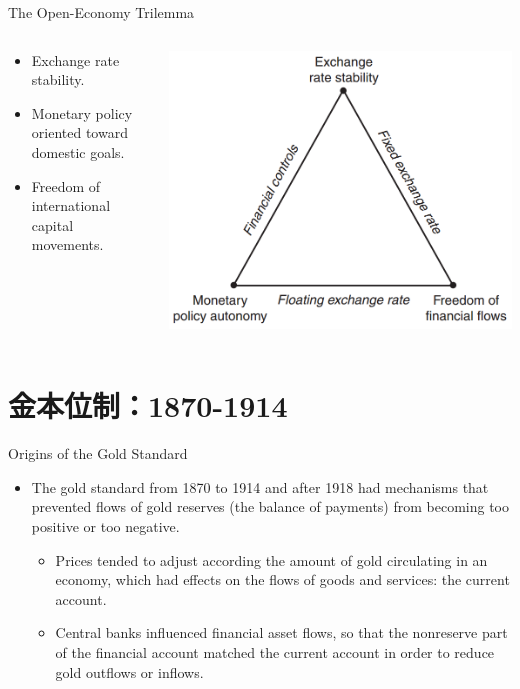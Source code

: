 \documentclass[10pt,hyperref={CJKbookmarks=true},xcolor=dvipsnames,aspectratio=169]{beamer}
\begin{document}
\begin{frame}{The Open-Economy Trilemma}
\begin{columns}[onlytextwidth]
	\begin{column}{0.6\textwidth}
		\begin{itemize}
			\item Exchange rate stability.
			\item Monetary policy oriented toward domestic goals.
			\item Freedom of international capital movements.
		\end{itemize}
	\end{column}
	\begin{column}{0.4\textwidth}
		\centering
		\includegraphics[scale=0.3]{fig/systems/trilemma}
	\end{column}
\end{columns}
\end{frame}


\section{金本位制：1870-1914}
\begin{frame}{Origins of the Gold Standard}
	\begin{itemize}
		\item The gold standard from 1870 to 1914 and after
		1918 had mechanisms that prevented flows of gold
		reserves (the balance of payments) from becoming
		too positive or too negative.
		\begin{itemize}
			\item  Prices tended to adjust according the amount of gold
			circulating in an economy, which had effects on the flows
			of goods and services: the current account.
			\item  Central banks influenced financial asset flows, so that the
			nonreserve part of the financial account matched the
			current account in order to reduce gold outflows or
			inflows.
		\end{itemize}
	\end{itemize}
\end{frame}
\end{document}

